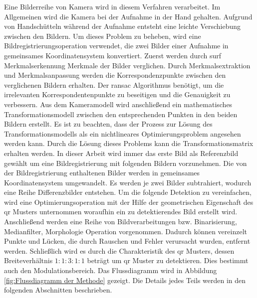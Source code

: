 Eine Bilderreihe von Kamera wird in diesem Verfahren verarbeitet. Im Allgemeinen wird die Kamera bei der Aufnahme in der Hand gehalten. Aufgrund von Handschütteln während der Aufnahme entsteht eine leichte Verschiebung zwischen den Bildern. Um dieses Problem zu beheben, wird eine Bildregistrierungsoperation verwendet, die zwei Bilder einer Aufnahme in gemeinsames Koordinatensystem konvertiert. Zuerst werden durch \gls{surf} Merkmalserkennung Merkmale der Bilder verglichen. 
Durch Merkmalsextraktion und Merkmalsanpassung werden die Korrespondenzpunkte zwischen den verglichenen Bildern erhalten. Der \gls{ransac} Algorithmus benötigt, um die irrelevanten Korrespondentenpunkte zu beseitigen und die Genauigkeit zu verbessern. Aus dem Kameramodell wird anschließend ein mathematisches Transformationsmodell zwischen den entsprechenden Punkten in den beiden Bildern erstellt. Es ist zu beachten, dass der Prozess zur Lösung des Transformationsmodells als ein nichtlineares Optimierungsproblem angesehen werden kann. Durch die Lösung dieses Problems kann die Transformationsmatrix erhalten werden. In dieser Arbeit wird immer das erste Bild als Referenzbild gewählt um eine Bildregistrierung mit folgenden Bildern vorzunehmen. Die von der Bildregistrierung enthaltenen Bilder werden in gemeinsames Koordinatensystem umgewandelt. Es werden je zwei Bilder subtrahiert, wodurch eine Reihe Differenzbilder entstehen. Um die folgende Detektion zu vereinfachen, wird eine Optimierungsoperation mit der Hilfe der geometrischen Eigenschaft des \gls{qr} Musters unternommen woraufhin ein zu detektierendes Bild erstellt wird. Anschließend werden eine Reihe von Bildverarbeitungen bzw. Binarisierung, Medianfilter, Morphologie Operation vorgenommen. Dadurch können vereinzelt Punkte und Lücken, die durch Rauschen und Fehler verursacht wurden, entfernt werden. Schließlich wird es durch die Charakteristik des \gls{qr} Musters, dessen Breiteverhältnis $1:1:3:1:1$ beträgt um \gls{qr} Muster zu detektieren. Dies bestimmt auch den Modulationsbereich. Das Flussdiagramm wird in Abbildung \ref{fig:Flussdiagramm der Methode} gezeigt. Die Details jedes Teils werden in den folgenden Abschnitten beschrieben.

